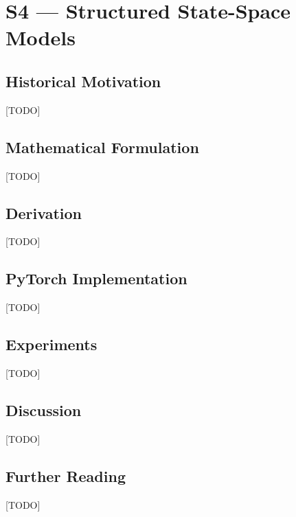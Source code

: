
\chapter{S4 — Structured State-Space Models}
\label{ch:13_s4}


\section{Historical Motivation}
[TODO]

\section{Mathematical Formulation}
[TODO]

\section{Derivation}
[TODO]

\section{PyTorch Implementation}
[TODO]

\section{Experiments}
[TODO]

\section{Discussion}
[TODO]

\section{Further Reading}
[TODO]
